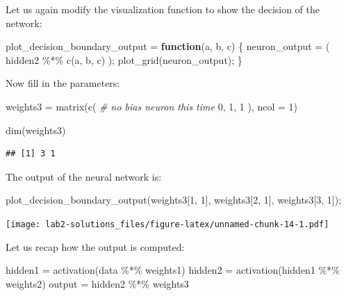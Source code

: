 \documentclass[
]{article}
\newenvironment{Shaded}{\begin{snugshade}}{\end{snugshade}}
\newcommand{\AttributeTok}[1]{\textcolor[rgb]{0.77,0.63,0.00}{#1}}
\newcommand{\CommentTok}[1]{\textcolor[rgb]{0.56,0.35,0.01}{\textit{#1}}}
\newcommand{\ControlFlowTok}[1]{\textcolor[rgb]{0.13,0.29,0.53}{\textbf{#1}}}
\newcommand{\DecValTok}[1]{\textcolor[rgb]{0.00,0.00,0.81}{#1}}
\newcommand{\FunctionTok}[1]{\textcolor[rgb]{0.00,0.00,0.00}{#1}}
\newcommand{\NormalTok}[1]{#1}
\newcommand{\OtherTok}[1]{\textcolor[rgb]{0.56,0.35,0.01}{#1}}
\newcommand{\SpecialCharTok}[1]{\textcolor[rgb]{0.00,0.00,0.00}{#1}}
\begin{document}
Let us again modify the visualization function to show the decision of
the network:

\begin{Shaded}
\begin{Highlighting}[]
\NormalTok{plot\_decision\_boundary\_output }\OtherTok{=} \ControlFlowTok{function}\NormalTok{(a, b, c) \{}
\NormalTok{  neuron\_output }\OtherTok{=}\NormalTok{ (}
\NormalTok{    hidden2 }\SpecialCharTok{\%*\%} \FunctionTok{c}\NormalTok{(a, b, c)}
\NormalTok{  );}
  \FunctionTok{plot\_grid}\NormalTok{(neuron\_output);}
\NormalTok{\}}
\end{Highlighting}
\end{Shaded}

Now fill in the parameters:

\begin{Shaded}
\begin{Highlighting}[]
\NormalTok{weights3 }\OtherTok{=} \FunctionTok{matrix}\NormalTok{(}\FunctionTok{c}\NormalTok{(}
  \CommentTok{\# no bias neuron this time}
  \DecValTok{0}\NormalTok{, }\DecValTok{1}\NormalTok{, }\DecValTok{1}
\NormalTok{), }\AttributeTok{ncol =} \DecValTok{1}\NormalTok{)}

\FunctionTok{dim}\NormalTok{(weights3)}
\end{Highlighting}
\end{Shaded}

\begin{verbatim}
## [1] 3 1
\end{verbatim}

The output of the neural network is:

\begin{Shaded}
\begin{Highlighting}[]
\FunctionTok{plot\_decision\_boundary\_output}\NormalTok{(weights3[}\DecValTok{1}\NormalTok{, }\DecValTok{1}\NormalTok{], weights3[}\DecValTok{2}\NormalTok{, }\DecValTok{1}\NormalTok{], weights3[}\DecValTok{3}\NormalTok{, }\DecValTok{1}\NormalTok{]);}
\end{Highlighting}
\end{Shaded}

\texttt{[image: lab2-solutions\_files/figure-latex/unnamed-chunk-14-1.pdf]}

Let us recap how the output is computed:

\begin{Shaded}
\begin{Highlighting}[]
\NormalTok{hidden1 }\OtherTok{=} \FunctionTok{activation}\NormalTok{(data }\SpecialCharTok{\%*\%}\NormalTok{ weights1)}
\NormalTok{hidden2 }\OtherTok{=} \FunctionTok{activation}\NormalTok{(hidden1 }\SpecialCharTok{\%*\%}\NormalTok{ weights2)}
\NormalTok{output }\OtherTok{=}\NormalTok{ hidden2 }\SpecialCharTok{\%*\%}\NormalTok{ weights3}
\end{Highlighting}
\end{Shaded}
\end{document}

